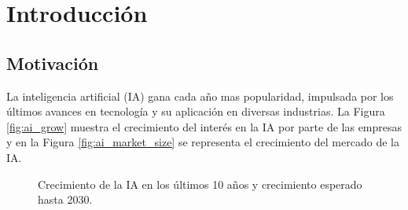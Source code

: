 \chapter{Introducción}

\section{Motivación}

La inteligencia artificial (IA) gana cada año mas popularidad, impulsada por los últimos avances en tecnología y su aplicación en diversas industrias. La Figura \ref{fig:ai_grow} muestra el crecimiento del interés en la IA por parte de las empresas y en la Figura \ref{fig:ai_market_size} se representa el crecimiento del mercado de la IA.

\begin{figure}[htb]
  \begin{subcaptiongroup}
  \begin{floatrow}
  \end{floatrow}
  \end{subcaptiongroup}
  \caption{Crecimiento de la IA en los últimos 10 años y crecimiento esperado hasta 2030.}%
\end{figure}

